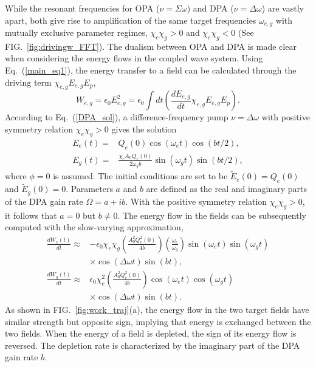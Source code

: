 \documentclass[aps,prl,nobibnotes,nofootinbib,showpacs,reprint]{revtex4-1}
\newcommand{\Fig}[1]{FIG.~\ref{#1}}
\newcommand{\Eq}[1]{Eq.~(\ref{#1})}
\newcommand{\we}{\omega_{e}}
\newcommand{\wg}{\omega_{g}}
\newcommand{\chie}{\chi_{e}}
\newcommand{\chig}{\chi_{g}}
\newcommand{\Dw}{\Delta \omega}
\newcommand{\Sw}{\Sigma \omega}
\newcommand{\Wm}{\Omega}
\begin{document}
While the resonant frequencies for OPA ($\nu = \Sw$) and DPA ($\nu = \Dw$) are vastly apart, both give rise to amplification of the same target frequencies $\omega_{e,g}$ with mutually exclusive parameter regimes, $\chie\chig > 0$ and $\chie\chig < 0$ (See \Fig{fig:drivingw_FFT}). The dualism between OPA and DPA is made clear when considering the energy flows in the coupled wave system. Using \Eq{main_eq1}, the energy transfer to a field can be calculated through the driving term $\chi_{e,g}E_{e,g}E_{p}$,
\begin{equation}\label{DPA_work0}
	W_{e,g} = \epsilon_{0}E^2_{e,g} = \epsilon_{0}\int dt \left( \frac{dE_{e,g}}{dt}\chi_{e,g}E_{e,g}E_{p} \right)	. 
\end{equation} 
According to \Eq{DPA_sol}, a difference-frequency pump $\nu = \Dw$ with positive symmetry relation $\chie\chig > 0$ gives the solution
\begin{equation}\label{DPA_work1}
	\begin{split}
	E_{e}(t) =& Q_{e}(0)\cos{(\we t)}\cos{(bt/2)},		\\
	E_{g}(t) =& \frac{\chie A_{0}Q_{e}(0)}{2\wg b}\sin{(\wg t)}\sin{(bt/2)},
	\end{split}	
\end{equation}
where $\phi = 0$ is assumed. The initial conditions are set to be $\tilde{E}_{e}(0) = Q_{e}(0)$ and $\tilde{E}_{g}(0) = 0$. Parameters $a$ and $b$ are defined as the real and imaginary parts of the DPA gain rate $\Wm = a + i b$. With the positive symmetry relation $\chie\chig > 0$, it follows that $a = 0$ but $b \neq 0$. The energy flow in the fields can be subsequently  computed with the slow-varying approximation,
\begin{equation}\label{DPA_work3}
	\begin{split}
	\frac{dW_{e}(t)}{dt} \approx& -\epsilon_{0}\chie\chig \left( \frac{ A_{0}^2 Q_{e}^2(0)}{4b} \right) \left( \frac{\we}{\wg} \right)\sin{\left( \we t \right)}\sin{\left( \wg t \right)}	\\
					& \times \cos{\left(\Dw t \right)} \sin{\left( b t\right)},	\\
	\frac{dW_{g}(t)}{dt} \approx& \epsilon_{0}\chie^2\left( \frac{ A_{0}^2 Q_{e}^2(0)}{4b} \right) \cos{\left( \we t \right)}\cos{\left( \wg t \right)}	\\
					& \times \cos{\left(\Dw t \right)}\sin{\left( b t\right)}	.
	\end{split}
\end{equation}
As shown in \Fig{fig:work_traj}(a), the energy flow in the two target fields have similar strength but opposite sign, implying that energy is exchanged between the two fields.  When the energy of a field is depleted, the sign of its energy flow is reversed. The depletion rate is characterized by the imaginary part of the DPA gain rate $b$. 
\end{document}
